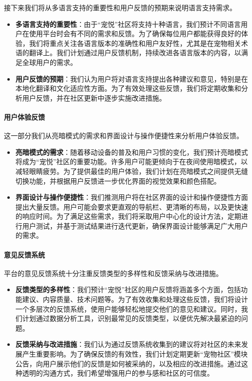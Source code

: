 接下来我们将从多语言支持的重要性和用户反馈的预期来说明语言支持需求。

\begin{itemize}
	\item \textbf{多语言支持的重要性}：由于“宠悦”社区将支持十种语言，我们预计不同语言用户在使用平台时会有不同的需求和反馈。为了确保每位用户都能获得良好的体验，我们将重点关注各语言版本的准确性和用户友好性，尤其是在宠物相关术语的翻译上。我们计划通过用户反馈机制，持续改进各语言版本的内容，以满足全球用户的需求。
	\item \textbf{用户反馈的预期}：我们认为用户将对语言支持提出各种建议和意见，特别是在本地化翻译和文化适应性方面。为了有效处理这些反馈，我们将定期收集和分析用户反馈，并在社区更新中逐步实施改进措施。
\end{itemize}

\paragraph{用户体验反馈}

这一部分我们从亮暗模式的需求和界面设计与操作便捷性来分析用户体验反馈。

\begin{itemize}
	\item \textbf{亮暗模式的需求}：随着移动设备的普及和用户习惯的变化，我们预计亮暗模式将成为“宠悦”社区的重要功能。许多用户可能更倾向于在夜间使用暗模式，以减轻眼睛疲劳。为了提供最佳的用户体验，我们计划在亮暗模式之间提供无缝切换功能，并根据用户反馈进一步优化界面的视觉效果和颜色搭配。	
	\item \textbf{界面设计与操作便捷性}：我们推测用户将在社区界面的设计和操作便捷性方面提出大量反馈。用户可能会要求更直观的导航栏、更清晰的布局，以及更快速的响应时间。为了满足这些需求，我们将采取用户中心化的设计方法，定期进行用户测试，并基于测试结果进行迭代更新，确保界面设计能够满足广大用户的需求。
\end{itemize}

\paragraph{意见反馈系统}

平台的意见反馈系统十分注重反馈类型的多样性和反馈采纳与改进措施。

\begin{itemize}
	\item \textbf{反馈类型的多样性}：我们预计“宠悦”社区的用户反馈将涵盖多个方面，包括功能建议、内容质量、技术问题等。为了有效收集和处理这些反馈，我们将设计一个多层次的反馈系统，使用户能够轻松地提交他们的意见和建议。同时，我们计划通过数据分析工具，识别最常见的反馈类型，以便优先解决最紧迫的问题。
	\item \textbf{反馈采纳与改进措施}：我们认为通过反馈系统收集到的建议将对社区的未来发展产生重要影响。为了确保反馈的有效性，我们计划定期更新“宠物社区”模块公告，向用户展示他们的反馈是如何被采纳的，以及相应的改进措施。通过这种透明的沟通方式，我们希望增强用户的参与感和社区的可信度。
\end{itemize}